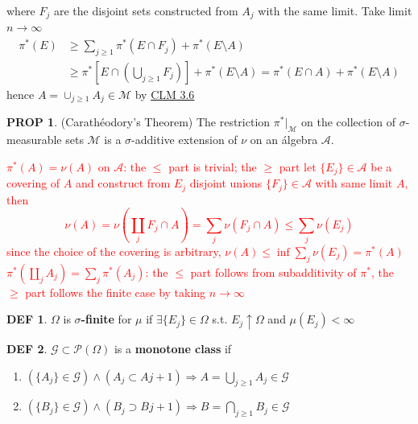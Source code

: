 \documentclass[hidelinks]{article}
\theoremstyle{definition}
\newtheorem*{defin}{DEF}
\theoremstyle{dotless}
\newtheorem{proposition}{PROP}[section]
\theoremstyle{remark}
\begin{document}
{\begin{enumerate}[label=\arabic*\degree]
\begin{equation*}
    \end{equation*}
    where $F_j$ are the disjoint sets constructed from $A_j$ with the same limit.\newline
    Take limit $n\to\infty$
    \begin{equation*}
    \begin{split}
        \pi^*(E)&\geq\sum_{j\geq1}\pi^*(E\cap F_j)+\pi^*(E\setminus A)\\
        &\geq\pi^*[E\cap(\bigcup_{j\geq1}F_j)]+\pi^*(E\setminus A)=\pi^*(E\cap A)+\pi^*(E\setminus A)
    \end{split}
    \end{equation*}
    hence $A=\cup_{j\geq1}A_j\in\mathscr{M}$ by \hyperref[CLM 3.6]{CLM 3.6}
\end{enumerate}}

\begin{proposition}(Carathéodory's Theorem) The restriction $\pi^*|_\mathscr{M}$ on the collection of $\sigma$-measurable sets $\mathscr{M}$ is a $\sigma$-additive extension of $\nu$ on an álgebra $\mathscr{A}$.
\end{proposition}
\textcolor{red}{$\pi^*(A)=\nu(A)$ on $\mathscr{A}$:\newline
the $\leq$ part is trivial; the $\geq$ part let $\{E_j\}\in\mathscr{A}$ be a covering of $A$ and construct from $E_j$ disjoint unions $\{F_j\}\in\mathscr{A}$ with same limit $A$, then
\[\nu(A)=\nu(\coprod_jF_j\cap A)=\sum_j\nu(F_j\cap A)\leq\sum_j\nu(E_j)\]
since the choice of the covering is arbitrary, $\nu(A)\leq\inf\sum\limits_j\nu(E_j)=\pi^*(A)$\newline
$\pi^*(\coprod\limits_jA_j)=\sum\limits_j\pi^*(A_j)$:\newline
the $\leq$ part follows from subadditivity of $\pi^*$, the $\geq$ part follows the finite case by taking $n\to\infty$}

\begin{defin}
$\Omega$ is \textbf{$\sigma$-finite} for $\mu$ if $\exists\{E_j\}\in\Omega$ s.t. $E_j\uparrow\Omega$ and $\mu(E_j)<\infty$
\end{defin}

\begin{defin}
$\mathscr{G}\subset\mathscr{P}(\Omega)$ is a \textbf{monotone class} if
\begin{enumerate}[label=\arabic*\degree]
    \item $(\{A_j\}\in\mathscr{G})\wedge(A_j\subset A{j+1})\Rightarrow A=\bigcup\limits_{j\geq1}A_j\in\mathscr{G}$
    \item $(\{B_j\}\in\mathscr{G})\wedge(B_j\supset B{j+1})\Rightarrow B=\bigcap\limits_{j\geq1}B_j\in\mathscr{G}$
\end{enumerate}
\end{defin}
\end{document}
